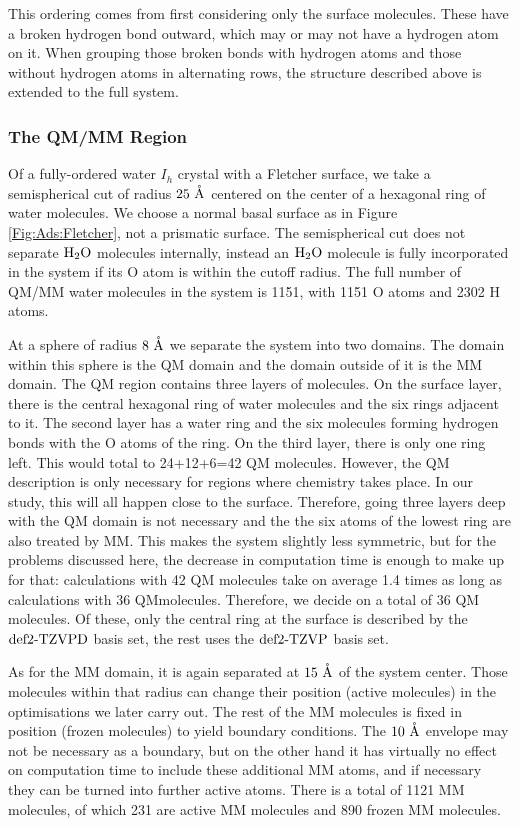 \documentclass[8.5pt,twoside,twocolumn]{article}
\renewcommand{\Ang}{\mathring{\te{A}}}
\theoremstyle{standard}
\begin{document}
This ordering comes from first considering only the surface molecules. These
have a broken hydrogen bond outward, which may or may not have a hydrogen
atom on it. When grouping those broken bonds with hydrogen atoms and those
without hydrogen atoms in alternating rows, the structure described above is
extended to the full system.


\subsubsection{The QM/MM Region}
Of a fully-ordered water $I_h$ crystal with a Fletcher surface, we take
a semispherical cut of radius $25~\Ang$ centered on the center of a hexagonal
ring of water molecules. We choose a normal basal surface as in
Figure \ref{Fig:Ads:Fletcher}, not a prismatic surface. The semispherical
cut does not separate $\text H _2 \text O$ molecules internally, instead an $\text H _2 \text O$ molecule
is fully incorporated in the system if its O atom is within the cutoff
radius. The full number of QM/MM water molecules in the system is
1151, with 1151 O atoms and 2302 H atoms.

At a sphere of radius $8~\Ang$ we separate the system into two domains. The
domain within this sphere is the QM domain and the domain outside of it
is the MM domain. 
The QM region contains three layers of molecules. On the surface layer,
there is the central hexagonal ring of water molecules and the six
rings adjacent to it. The second layer has a water ring and the six
molecules forming hydrogen bonds with the O atoms of the ring. On 
the third layer, there is only one ring left. This would total
to 24+12+6=42 QM molecules. However, the QM description is only
necessary for regions where chemistry takes place. In our study,
this will all happen close to the surface. Therefore, going three
layers deep with the QM domain is not necessary and the the six
atoms of the lowest ring are also treated by MM. This makes the system slightly
less symmetric, but for the problems discussed here, the decrease in
computation time is enough to make up for that: calculations with 42 QM molecules
take on average 1.4 times as long as calculations with 36 QMmolecules.
Therefore, we decide on a total of 36 QM molecules. 
Of these, only the central ring at
the surface is described by the $\text{def2-TZVPD}$ basis set, the rest
uses the $\text{def2-TZVP}$ basis set. 

As for the MM domain, it is again separated at $15~\Ang$ of the system center.
Those molecules within that radius can change their position (active molecules) in the optimisations we
later carry out. The rest of the MM molecules is fixed in position (frozen molecules) to yield
boundary conditions. The $10~\Ang$ envelope may not be necessary as a boundary,
but on the other hand it has virtually no effect on computation time to include
these additional MM atoms, and if necessary they can be turned into
further active atoms. There is a total of 1121 MM molecules, of
which 231 are active MM molecules and 890 frozen MM molecules.
\end{document}
